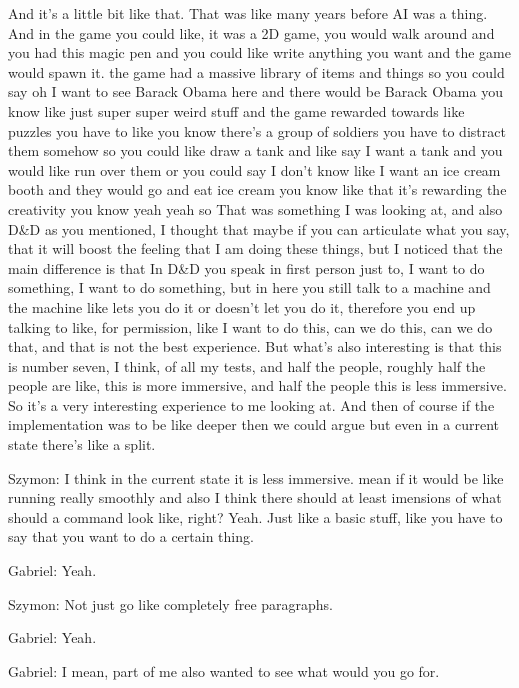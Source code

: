\begin{QandA}
\begin{answered}
            And it's a little bit like that.
            That was like many years before AI was a thing.
            And in the game you could like, it was a 2D game, you would walk around and you had this magic pen and you could like write anything you want and the game would spawn it.
            the game had a massive library of items and things so you could say oh I want to see Barack Obama here and there would be Barack Obama you know like just super super weird stuff and the game rewarded towards like puzzles you have to like you know there's a group of soldiers you have to distract them somehow so you could like draw a tank and like say I want a tank and you would like run over them or you could say I don't know like I want an ice cream booth and they would go and eat ice cream you know like that it's rewarding the creativity you know yeah yeah so
            That was something I was looking at, and also D\&D as you mentioned, I thought that maybe if you can articulate what you say, that it will boost the feeling that I am doing these things, but I noticed that the main difference is that
            In D\&D you speak in first person just to, I want to do something, I want to do something, but in here you still talk to a machine and the machine like lets you do it or doesn't let you do it, therefore you end up talking to like, for permission, like I want to do this, can we do this, can we do that, and that is not the best experience.
            But what's also interesting is that this is number seven, I think, of all my tests, and half the people, roughly half the people are like, this is more immersive, and half the people this is less immersive.
            So it's a very interesting experience to me looking at.
            And then of course if the implementation was to be like deeper then we could argue but even in a current state there's like a split.

            Szymon: I think in the current state it is less immersive.
            mean if it would be like running really smoothly and also I think there should at least
            imensions of what should a command look like, right?
            Yeah.
            Just like a basic stuff, like you have to say that you want to do a certain thing.

            Gabriel: Yeah.

            Szymon: Not just go like completely free paragraphs.

            Gabriel: Yeah.

            Gabriel: I mean, part of me also wanted to see what would you go for.


\end{answered}
\end{QandA}
